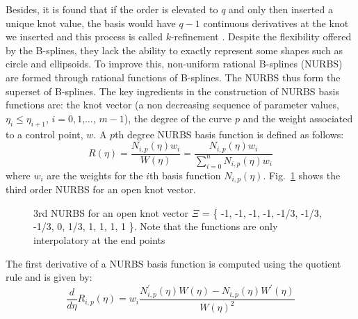 Besides, it is found that if the order is elevated to $q$ and only then inserted a unique knot value, the basis would have $q-1$ continuous derivatives at the knot we inserted and this process is called $k$-refinement \cite{Hug2005b}.
Despite the flexibility offered by the B-splines, they lack the ability to exactly represent some shapes such as circle and ellipsoids.
To improve this, non-uniform rational B-splines (NURBS) are formed through rational functions of B-splines.
The NURBS thus form the superset of B-splines.
The key ingredients in the construction of NURBS basis functions are: the knot vector (a non decreasing sequence of parameter values, $\eta_i \leq \eta_{i+1}$, $i=0,1$,$\dots$, $m-1$), the degree of the curve $p$ and the weight associated to a control point, $w$.
A $p$th degree NURBS basis function is defined as follows:
\begin{equation}
    R(\eta) =   \frac{ N_{i,p}(\eta) w_i }{W(\eta)}
            =   \frac{ N_{i,p}(\eta) w_i }{
                    \sum_{i=0}^{n} N_{i,p}(\eta)w_i
                }
\label{iso_eq:rational_basis_function}
\end{equation}
where $w_i$ are the weights for the $i$th basis function $N_{i,p}(\eta)$.
Fig.~\ref{lr_fig:nurbs_rational_basis} shows the third order NURBS for an open knot vector.

\begin{figure}
    \centering
    \caption{3rd NURBS for an open knot vector $\Xi$ = \{ -1, -1, -1, -1, -1/3, -1/3, -1/3, 0, 1/3, 1, 1, 1, 1 \}. Note that the functions are only interpolatory at the end points}
    \label{lr_fig:nurbs_rational_basis}
\end{figure}

The first derivative of a NURBS basis function is computed using the quotient rule and is given by:
\begin{equation}
    \frac{d}{d\eta}R_{i,p}(\eta) =  w_i\frac{
        N^\prime_{i,p}(\eta)W(\eta) - N_{i,p}(\eta) W^\prime(\eta)
    }{W(\eta)^2}
\end{equation}